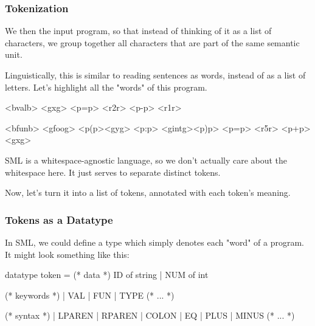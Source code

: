 \documentclass[aspectratio=169]{beamer}
\begin{document}
\begin{frame}[fragile]
  \frametitle{Tokenization}

  We then  the input program, so that instead of thinking of it
  as a list of characters, we group together all characters that are part of
  the same semantic unit.

  \pause
  \vspace{\fill}

  Linguistically, this is similar to reading sentences as words, instead of as
  a list of letters. Let's highlight all the "words" of this program.

  \pause
  \vspace{\fill}

  \begin{codeblock}[keywordstyle=, morekeywords={}, style=expandedHL]
    <bvalb> <gxg> <p=p> <r2r> <p-p> <r1r>

    <bfunb> <gfoog> <p(p><gyg> <p:p> <gintg><p)p> <p=p> <r5r> <p+p> <gxg>
  \end{codeblock}

  \pause
  \vspace{\fill}

  SML is a whitespace-agnostic language, so we don't actually care about
  the whitespace here. It just serves to separate distinct tokens.

  \pause
  \vspace{\fill}

  Now, let's turn it into a list of tokens, annotated with each token's meaning.
\end{frame}

\begin{frame}[fragile]
  \frametitle{Tokens as a Datatype}

  \tgs

  In SML, we could define a type  which simply denotes each
  "word" of a program. It might look something like this:

  \pause
  \begin{codeblock}
    datatype token =
      (* data *)
        ID of string | NUM of int

      (* keywords *)
      | VAL | FUN | TYPE (* ... *)

      (* syntax *)
      | LPAREN | RPAREN | COLON | EQ | PLUS | MINUS
      (* ... *)
  \end{codeblock}
\end{frame}
\end{document}
